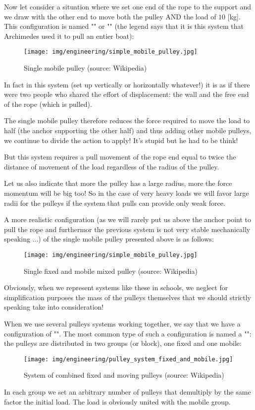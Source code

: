 	Now let consider a situation where we set one end of the rope to the support and we draw with the other end to move both the pulley AND the load of $10$ [kg]. This configuration is named "" or "" (the legend says that it is this system that Archimedes used it to pull an entier boat):
	\begin{figure}[H]
		\centering
		\texttt{[image: img/engineering/simple\_mobile\_pulley.jpg]}
		\caption[Single mobile pulley]{Single mobile pulley (source: Wikipedia)}
	\end{figure}
	In fact in this system (set up vertically or horizontally whatever!) it is as if there were two people who shared the effort of displacement: the wall and the free end of the rope (which is pulled).
	
	The single mobile pulley therefore reduces the force required to move the load to half (the anchor supporting the other half) and thus adding other mobile pulleys, we continue to divide the action to apply! It's stupid but he had to be think!
	
	But this system requires a pull movement of the rope end equal to twice the distance of movement of the load regardless of the radius of the pulley.
	
	Let us also indicate that more the pulley has a large radius, more the force momentum will be big too! So in the case of very heavy loads we will favor large radii for the pulleys if the system that pulls can provide only weak force.
	
	A more realistic configuration (as we will rarely put us above the anchor point to pull the rope and furthermor the previous system is not very stable mechanically speaking ...) of the single mobile pulley presented above is as follows:
	\begin{figure}[H]
		\centering
		\texttt{[image: img/engineering/simple\_mobile\_pulley.jpg]}
		\caption[Single fixed and mobile mixed pulley]{Single fixed and mobile mixed pulley (source: Wikipedia)}
	\end{figure}
	Obviously, when we represent systems like these in schools, we neglect for simplification purposes the mass of the pulleys themselves that we should strictly speaking take into consideration!
	
	When we use several pulleys systems working together, we say that we have a configuration of "". The most common type of such a configuration is named a "": the pulleys are distributed in two groups (or block), one fixed and one mobile:
	\begin{figure}[H]
		\centering
		\texttt{[image: img/engineering/pulley\_system\_fixed\_and\_mobile.jpg]}
		\caption[System of combined fixed and moving pulleys]{System of combined fixed and moving pulleys (source: Wikipedia)}
	\end{figure}
	In each group we set an arbitrary number of pulleys that demultiply by the same factor the initial load. The load is obviously united with the mobile group.
	
